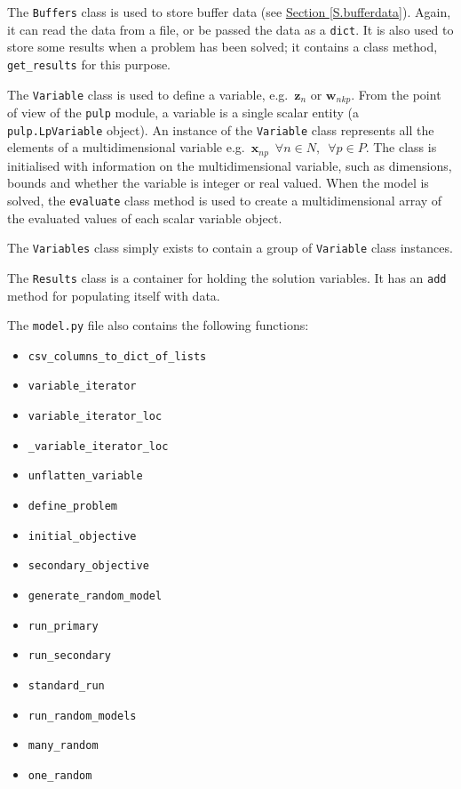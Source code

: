 The \texttt{Buffers} class is used to store buffer data (see 
\hyperref[S.bufferdata]{Section \ref*{S.bufferdata}}). 
Again, it can read the data from a file, or be passed the data as a
\texttt{dict}. It is also used to store some results when a problem has been
solved; it contains a class method, \texttt{get\_results} for this purpose.

The \texttt{Variable} class is used to define a variable, e.g.\
$\boldsymbol{z}_{n}$ or $\boldsymbol{w}_{nkp}$. 
From the point of view of the \texttt{pulp} module, a variable is a single
scalar entity (a \texttt{pulp.LpVariable} object).
An instance of the \texttt{Variable} class represents all the elements of a 
multidimensional variable e.g.\
$\boldsymbol{x}_{np} \enspace \forall n \in N, \enspace \forall p \in P$.
The class is initialised with information on the multidimensional variable,
such as dimensions, bounds and whether the variable is integer or real valued.
When the model is solved, the \texttt{evaluate} class method is used to create
a multidimensional array of the evaluated values of each scalar variable
object.

The \texttt{Variables} class simply exists to contain a group of
\texttt{Variable} class instances.

The \texttt{Results} class is a container for holding the solution variables.
It has an \texttt{add} method for populating itself with data.

The \texttt{model.py} file also contains the following functions:
\begin{itemize}
    \item \texttt{csv\_columns\_to\_dict\_of\_lists}
    \item \texttt{variable\_iterator}
    \item \texttt{variable\_iterator\_loc}
    \item \texttt{\_variable\_iterator\_loc}
    \item \texttt{unflatten\_variable}
    \item \texttt{define\_problem}
    \item \texttt{initial\_objective}
    \item \texttt{secondary\_objective}
    \item \texttt{generate\_random\_model}
    \item \texttt{run\_primary}
    \item \texttt{run\_secondary}
    \item \texttt{standard\_run}
    \item \texttt{run\_random\_models}
    \item \texttt{many\_random}
    \item \texttt{one\_random}    
\end{itemize}

